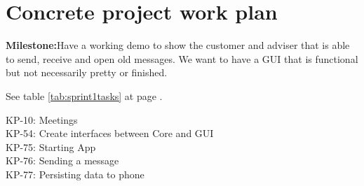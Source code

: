 \section{Concrete project work plan}

\textbf{Milestone:}Have a working demo to show the customer and adviser that is able to send, receive and open old messages. We want to have a GUI that is functional but not necessarily pretty or finished.

See table \ref{tab:sprint1tasks} at page \pageref{tab:sprint1tasks}.
\begin{table}
KP-10: Meetings \\ 
KP-54: Create interfaces between Core and GUI \\
KP-75: Starting App \\
KP-76: Sending a message\\
KP-77: Persisting data to phone\\


\end{table}

